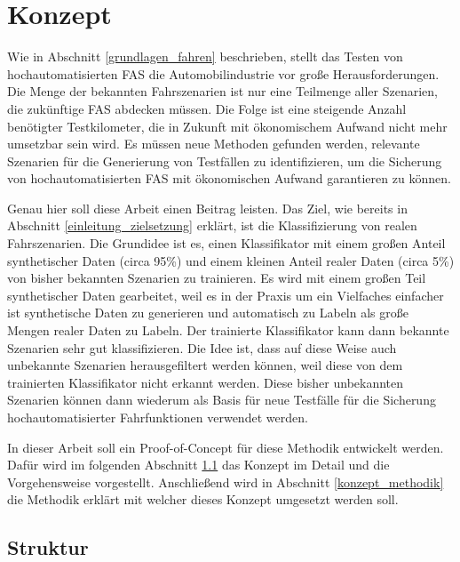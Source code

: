 
\chapter{Konzept}
\label{konzept}

Wie in Abschnitt \ref{grundlagen_fahren} beschrieben, stellt das Testen von hochautomatisierten \ac{FAS} die Automobilindustrie vor große Herausforderungen. Die Menge der bekannten Fahrszenarien ist nur eine Teilmenge aller Szenarien, die zukünftige \ac{FAS} abdecken müssen. Die Folge ist eine steigende Anzahl benötigter Testkilometer, die in Zukunft mit ökonomischem Aufwand nicht mehr umsetzbar sein wird. Es müssen neue Methoden gefunden werden, relevante Szenarien für die Generierung von Testfällen zu identifizieren, um die Sicherung von hochautomatisierten \ac{FAS} mit ökonomischen Aufwand garantieren zu können.

Genau hier soll diese Arbeit einen Beitrag leisten. Das Ziel, wie bereits in Abschnitt \ref{einleitung_zielsetzung} erklärt, ist die Klassifizierung von realen Fahrszenarien. Die Grundidee ist es, einen Klassifikator mit einem großen Anteil synthetischer Daten (circa 95\%) und einem kleinen Anteil realer Daten (circa 5\%) von bisher bekannten Szenarien zu trainieren. Es wird mit einem großen Teil synthetischer Daten gearbeitet, weil es in der Praxis um ein Vielfaches einfacher ist synthetische Daten zu generieren und automatisch zu Labeln als große Mengen realer Daten zu Labeln. Der trainierte Klassifikator kann dann bekannte Szenarien sehr gut klassifizieren. Die Idee ist, dass auf diese Weise auch unbekannte Szenarien herausgefiltert werden können, weil diese von dem trainierten Klassifikator nicht erkannt werden. Diese bisher unbekannten Szenarien können dann wiederum als Basis für neue Testfälle für die Sicherung hochautomatisierter Fahrfunktionen verwendet werden.

In dieser Arbeit soll ein Proof-of-Concept für diese Methodik entwickelt werden. Dafür wird im folgenden Abschnitt \ref{konzept_struktur} das Konzept im Detail und die Vorgehensweise vorgestellt. Anschließend wird in Abschnitt \ref{konzept_methodik} die Methodik erklärt mit welcher dieses Konzept umgesetzt werden soll.


\section{Struktur}
\label{konzept_struktur}

